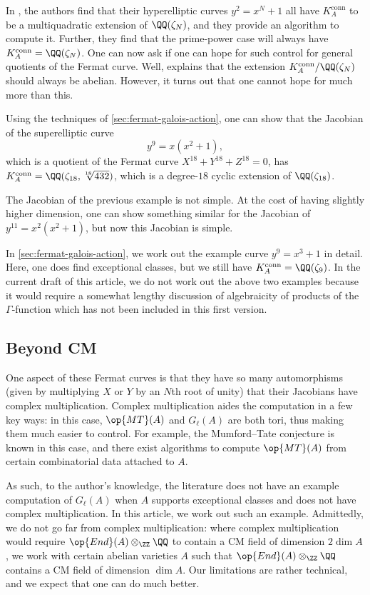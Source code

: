 \documentclass[openany]{book}
\begin{document}
In \cite[Theorem~7.1.1]{ggl-fermat}, the authors find that their hyperelliptic curves $y^2=x^N+1$ all have $K_A^{\mathrm{conn}}$ to be a multiquadratic extension of $\QQ(\zeta_N)$, and they provide an algorithm to compute it. Further, they find that the prime-power case will always have $K_A^{\mathrm{conn}}=\QQ(\zeta_N)$. One can now ask if one can hope for such control for general quotients of the Fermat curve. Well, \cite[Theorem~7.15]{deligne-hodge} explains that the extension $K_A^{\mathrm{conn}}/\QQ(\zeta_N)$ should always be abelian. However, it turns out that one cannot hope for much more than this.
\begin{example}
	Using the techniques of \cref{sec:fermat-galois-action}, one can show that the Jacobian of the superelliptic curve
	\[y^9=x\left(x^2+1\right),\]
	which is a quotient of the Fermat curve $X^{18}+Y^{18}+Z^{18}=0$, has $K_A^{\mathrm{conn}}=\QQ(\zeta_{18},\sqrt[18]{432})$, which is a degree-$18$ cyclic extension of $\QQ(\zeta_{18})$.
\end{example}
\begin{example}
	The Jacobian of the previous example is not simple. At the cost of having slightly higher dimension, one can show something similar for the Jacobian of $y^{11}=x^2\left(x^2+1\right)$, but now this Jacobian is simple.
\end{example}
In \cref{sec:fermat-galois-action}, we work out the example curve $y^9=x^3+1$ in detail. Here, one does find exceptional classes, but we still have $K_A^{\mathrm{conn}}=\QQ(\zeta_9)$. In the current draft of this article, we do not work out the above two examples because it would require a somewhat lengthy discussion of algebraicity of products of the $\Gamma$-function which has not been included in this first version.

\subsection{Beyond CM}
One aspect of these Fermat curves is that they have so many automorphisms (given by multiplying $X$ or $Y$ by an $N$th root of unity) that their Jacobians have complex multiplication. Complex multiplication aides the computation in a few key ways: in this case, $\op{MT}(A)$ and $G_\ell(A)$ are both tori, thus making them much easier to control. For example, the Mumford--Tate conjecture is known in this case, and there exist algorithms to compute $\op{MT}(A)$ from certain combinatorial data attached to $A$.

As such, to the author's knowledge, the literature does not have an example computation of $G_\ell(A)$ when $A$ supports exceptional classes and does not have complex multiplication. In this article, we work out such an example. Admittedly, we do not go far from complex multiplication: where complex multiplication would require $\op{End}(A)\otimes_\ZZ\QQ$ to contain a CM field of dimension $2\dim A$, we work with certain abelian varieties $A$ such that $\op{End}(A)\otimes_\ZZ\QQ$ contains a CM field of dimension $\dim A$. Our limitations are rather technical, and we expect that one can do much better.
\end{document}
